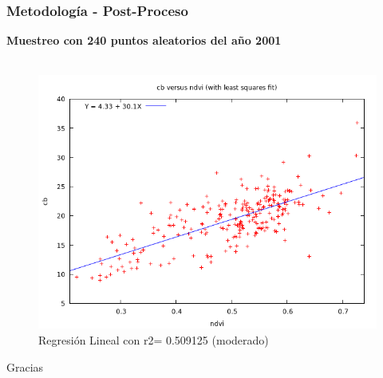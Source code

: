 \documentclass[xcolor=table]{beamer}
\begin{document}
\begin{frame}
	\frametitle{Metodolog\'ia - Post-Proceso}
		\textbf{Muestreo con 240 puntos aleatorios del a\~{n}o 2001}\\~\\	
\begin{figure}
\centering
\includegraphics[width=0.7\linewidth, height=0.6\textheight]{imagenes/ndviCarb}
\caption{Regresi\'on Lineal con r2= 0.509125 (moderado)}
\label{fig:ndviCarb}
\end{figure}

	
\end{frame}





\begin{frame}
\Huge{\centerline{Gracias}}
\end{frame}

\end{document}
